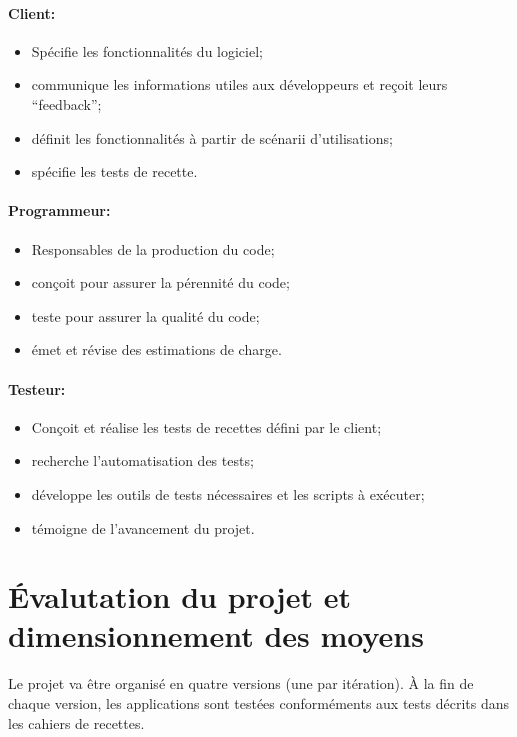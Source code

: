 \documentclass[a4paper,11pt,french]{article}
\begin{document}
\paragraph{Client:}
\begin{itemize}
 \item Spécifie les fonctionnalités du logiciel;
 \item communique les informations utiles aux développeurs et reçoit leurs 
``feedback'';
 \item définit les fonctionnalités à partir de scénarii d'utilisations;
 \item spécifie les tests de recette.
\end{itemize}

\paragraph{Programmeur:}
\begin{itemize}
 \item Responsables de la production du code;
 \item conçoit pour assurer la pérennité du code;
 \item teste pour assurer la qualité du code;
 \item émet et révise des estimations de charge.
\end{itemize}

\paragraph{Testeur:}
\begin{itemize}
 \item Conçoit et réalise les tests de recettes défini par le client;
 \item recherche l'automatisation des tests;
 \item développe les outils de tests nécessaires et les scripts à exécuter;
 \item témoigne de l'avancement du projet.
\end{itemize}

\section{Évalutation du projet et dimensionnement des moyens}
Le projet va être organisé en quatre versions (une par itération).
À la fin de chaque version, les applications sont testées 
conforméments  aux tests décrits dans les cahiers de recettes.
\end{document}
